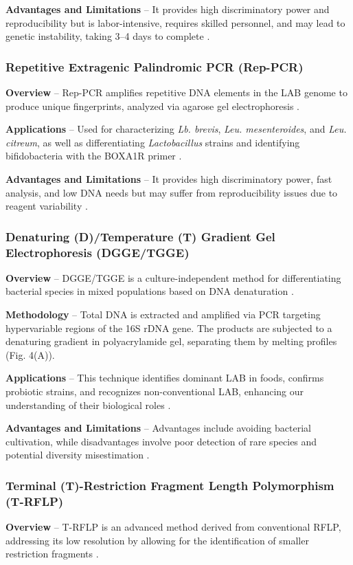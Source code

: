 \textbf{Advantages and Limitations} – It provides high discriminatory power and reproducibility but is labor-intensive, requires skilled personnel, and may lead to genetic instability, taking 3–4 days to complete \cite*{L4-MolTyping}.

\subsubsection*{Repetitive Extragenic Palindromic PCR (Rep-PCR)}
\textbf{Overview} – Rep-PCR amplifies repetitive DNA elements in the LAB genome to produce unique fingerprints, analyzed via agarose gel electrophoresis \cite*{L4-MolTyping}.

\textbf{Applications} – Used for characterizing \textit{Lb. brevis}, \textit{Leu. mesenteroides}, and \textit{Leu. citreum}, as well as differentiating \textit{Lactobacillus} strains and identifying bifidobacteria with the BOXA1R primer \cite*{L4-MolTyping}.

\textbf{Advantages and Limitations} – It provides high discriminatory power, fast analysis, and low DNA needs but may suffer from reproducibility issues due to reagent variability \cite*{L4-MolTyping}.

\subsubsection{Denaturing (D)/Temperature (T) Gradient Gel Electrophoresis (DGGE/TGGE)}
\textbf{Overview} – DGGE/TGGE is a culture-independent method for differentiating bacterial species in mixed populations based on DNA denaturation \cite*{L4-MolTyping}.

\textbf{Methodology} – Total DNA is extracted and amplified via PCR targeting hypervariable regions of the 16S rDNA gene. The products are subjected to a denaturing gradient in polyacrylamide gel, separating them by melting profiles (Fig. 4(A)).

\textbf{Applications} – This technique identifies dominant LAB in foods, confirms probiotic strains, and recognizes non-conventional LAB, enhancing our understanding of their biological roles \cite*{L4-MolTyping}.

\textbf{Advantages and Limitations} – Advantages include avoiding bacterial cultivation, while disadvantages involve poor detection of rare species and potential diversity misestimation \cite*{L4-MolTyping}.

\subsubsection{Terminal (T)-Restriction Fragment Length Polymorphism (T-RFLP)}
\textbf{Overview} – T-RFLP is an advanced method derived from conventional RFLP, addressing its low resolution by allowing for the identification of smaller restriction fragments \cite*{L4-MolTyping}.

